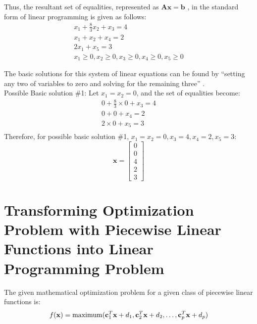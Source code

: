 \documentclass[letter,12pt]{article}
\begin{document}
Thus, the resultant set of equalities, represented as $\mathbf{Ax = b}$ \cite[\S2.1, page 19]{Luenberger2008}, in the standard form \cite[\S2.1, pages 11]{Luenberger2008} of linear programming is given as follows:
\begin{eqnarray*}
x_{1} + \frac{8}{3}x_{2} + x_{3} = 4 \\
x_{1} + x_{2} + x_{4} = 2 \\
2x_{1} + x_{5} = 3 \\
x_{1} \geq 0, x_{2} \geq 0, x_{3} \geq 0, x_{4} \geq 0, x_{5} \geq 0
\end{eqnarray*}

The basic solutions for this system of linear equations can be found by ``setting any two of variables to zero and solving for the remaining three'' \cite[\S2.5, page 26]{Luenberger2008}. \\

Possible Basic solution \#1:
Let $x_{1} = x_{2} = 0$, and the set of equalities become:
\begin{eqnarray*}
0 + \frac{8}{3} \times 0 + x_{3} = 4 \\
0 + 0 + x_{4} = 2 \\
2 \times 0 + x_{5} = 3 \\
\end{eqnarray*}
Therefore, for possible basic solution \#1, $x_{1} = x_{2} = 0, x_{3} = 4, x_{4} = 2, x_{5} = 3$:
\begin{equation}
\mathbf{x} = \left[
	\begin{array}{c}
	0 \\ 0 \\ 4 \\ 2 \\ 3
	\end{array}
	\right]
\end{equation}


\section{Transforming Optimization Problem with Piecewise Linear Functions into Linear Programming Problem}
\label{sec:optimizationproblemtransformation}

The given mathematical optimization problem for a given class of piecewise linear functions is:
\begin{eqnarray*}
f({\mathbf{x}}) = {\rm maximum} (\mathbf{c}^{T}_{1}\mathbf{x} + d_{1}, \mathbf{c}^{T}_{2}\mathbf{x} + d_{2}, \dots, \mathbf{c}^{T}_{p}\mathbf{x} + d_{p})
\end{eqnarray*}
\end{document}
